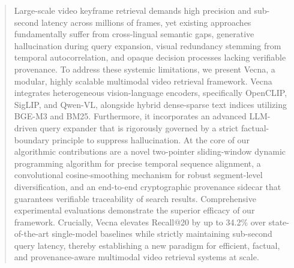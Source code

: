 \begin{abstract}
Large-scale video keyframe retrieval demands high precision and sub-second latency across millions of frames, yet existing approaches fundamentally suffer from cross-lingual semantic gaps, generative hallucination during query expansion, visual redundancy stemming from temporal autocorrelation, and opaque decision processes lacking verifiable provenance. To address these systemic limitations, we present Vecna, a modular, highly scalable multimodal video retrieval framework. Vecna integrates heterogeneous vision-language encoders, specifically OpenCLIP, SigLIP, and Qwen-VL, alongside hybrid dense-sparse text indices utilizing BGE-M3 and BM25. Furthermore, it incorporates an advanced LLM-driven query expander that is rigorously governed by a strict factual-boundary principle to suppress hallucination. At the core of our algorithmic contributions are a novel two-pointer sliding-window dynamic programming algorithm for precise temporal sequence alignment, a convolutional cosine-smoothing mechanism for robust segment-level diversification, and an end-to-end cryptographic provenance sidecar that guarantees verifiable traceability of search results. Comprehensive experimental evaluations demonstrate the superior efficacy of our framework. Crucially, Vecna elevates Recall@20 by up to 34.2\% over state-of-the-art single-model baselines while strictly maintaining sub-second query latency, thereby establishing a new paradigm for efficient, factual, and provenance-aware multimodal video retrieval systems at scale.
\end{abstract}
